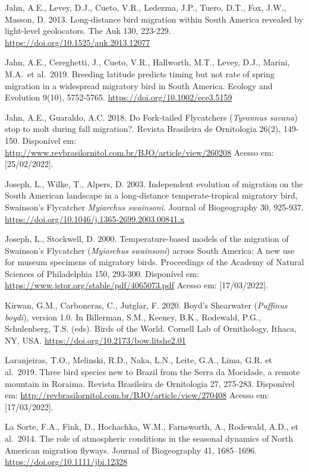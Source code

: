 \documentclass[
  oneside]{scrbook}
\begin{document}
Jahn, A.E., Levey, D.J., Cueto, V.R., Ledezma, J.P., Tuero, D.T., Fox, J.W., Masson, D. 2013. Long-distance bird migration within South America revealed by light-level geolocators. The Auk 130, 223-229. \url{https://doi.org/10.1525/auk.2013.12077}

Jahn, A.E., Cereghetti, J., Cueto, V.R., Hallworth, M.T., Levey, D.J., Marini, M.A.~et al.~2019. Breeding latitude predicts timing but not rate of spring migration in a widespread migratory bird in South America. Ecology and Evolution 9(10), 5752-5765. \url{https://doi.org/10.1002/ece3.5159}

Jahn, A.E., Guaraldo, A.C. 2018. Do Fork-tailed Flycatchers (\emph{Tyrannus savana}) stop to molt during fall migration?. Revista Brasileira de Ornitologia 26(2), 149-150. Disponível em: \url{http://www.revbrasilornitol.com.br/BJO/article/view/260208} Acesso em: {[}25/02/2022{]}.

Joseph, L., Wilke, T., Alpers, D. 2003. Independent evolution of migration on the South American landscape in a long-distance temperate-tropical migratory bird, Swainson's Flycatcher \emph{Myiarchus swainsoni}. Journal of Biogeography 30, 925-937. \url{https://doi.org/10.1046/j.1365-2699.2003.00841.x}

Joseph, L., Stockwell, D. 2000. Temperature-based models of the migration of Swainson's Flycatcher (\emph{Myiarchus swainsoni}) across South America: A new use for museum specimens of migratory birds. Proceedings of the Academy of Natural Sciences of Philadelphia 150, 293-300. Disponível em: \url{https://www.jstor.org/stable/pdf/4065073.pdf} Acesso em: {[}17/03/2022{]}.

Kirwan, G.M., Carboneras, C., Jutglar, F. 2020. Boyd's Shearwater (\emph{Puffinus boydi}), version 1.0. In Billerman, S.M., Keeney, B.K., Rodewald, P.G., Schulenberg, T.S. (eds). Birds of the World. Cornell Lab of Ornithology, Ithaca, NY, USA. \url{https://doi.org/10.2173/bow.litshe2.01}

Laranjeiras, T.O., Melinski, R.D., Naka, L.N., Leite, G.A., Lima, G.R. et al.~2019. Three bird species new to Brazil from the Serra da Mocidade, a remote mountain in Roraima. Revista Brasileira de Ornitologia 27, 275‑283. Disponível em: \url{http://revbrasilornitol.com.br/BJO/article/view/270408} Acesso em: {[}17/03/2022{]}.

La Sorte, F.A., Fink, D., Hochachka, W.M., Farnsworth, A., Rodewald, A.D., et al.~2014. The role of atmospheric conditions in the seasonal dynamics of North American migration flyways. Journal of Biogeography 41, 1685--1696. \url{https://doi.org/10.1111/jbi.12328}
\end{document}
